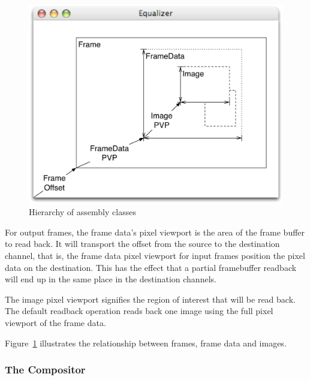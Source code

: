 \documentclass[10pt,a4]{scrartcl}
\newcommand{\fig}[1]{Figure~\ref{#1}}
\begin{document}
\begin{figure}
  \includegraphics[width=.618\textwidth]{images/assembly.pdf}
  {\caption{\small\label{fAssembly}Hierarchy of assembly classes}}
\end{figure}
For output frames, the frame data's pixel viewport is the area of the
frame buffer to read back. It will transport the offset from the source
to the destination channel, that is, the frame data pixel viewport for
input frames position the pixel data on the destination. This has the
effect that a partial framebuffer readback will end up in the same place
in the destination channels.

The image pixel viewport signifies the region of interest that will be read
back. The default readback operation reads back one image using the full
pixel viewport of the frame data.

\fig{fAssembly} illustrates the relationship between frames, frame data
and images.

\subsubsection{\label{sCompositor}The Compositor}
\end{document}
